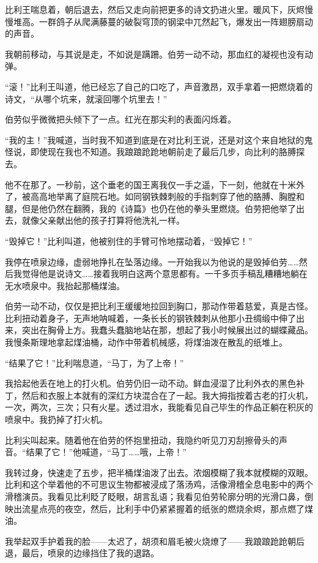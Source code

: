\documentclass[AutoFakeBold=true]{book}
\begin{document}
比利王喘息着，朝后退去，然后又走向前把更多的诗文扔进火里。暖风下，灰烬慢慢堆高。一群鸽子从爬满藤蔓的破裂穹顶的钢梁中兀然起飞，爆发出一阵翅膀扇动的声音。

我朝前移动，与其说是走，不如说是蹒跚。伯劳一动不动，那血红的凝视也没有动弹。

``滚！''比利王叫道，他已经忘了自己的口吃了，声音激昂，双手拿着一把燃烧着的诗文，``从哪个坑来，就滚回哪个坑里去！''

伯劳似乎微微把头倾下了一点。红光在那尖利的表面闪烁着。

``我的主！''我喊道，当时我不知道到底是在对比利王说，还是对这个来自地狱的鬼怪说，即使现在我也不知道。我踉踉跄跄地朝前走了最后几步，向比利的胳膊探去。

他不在那了。一秒前，这个垂老的国王离我仅一手之遥，下一刻，他就在十米外了，被高高地举离了庭院石地。如同钢铁棘刺般的手指刺穿了他的胳膊、胸膛和腿，但是他仍然在翻腾，我的《诗篇》也仍在他的拳头里燃烧。伯劳把他举了出去，就像父亲献出他的孩子打算将他洗礼一样。

``毁掉它！''比利叫道，他被别住的手臂可怜地摆动着，``毁掉它！''

我停在喷泉边缘，虚弱地挣扎在坠落边缘。一开始我以为他说的是毁掉伯劳……然后我觉得他是说诗文……接着我明白这两个意思都有。一千多页手稿乱糟糟地躺在无水喷泉中。我抬起那桶煤油。

伯劳一动不动，仅仅是把比利王缓缓地拉回到胸口，那动作带着慈爱，真是古怪。比利扭动着身子，无声地呐喊着，一条长长的钢铁棘刺从他那小丑绸缎中伸了出来，突出在胸骨上方。我蠢头蠢脑地站在那，想起了我小时候展出过的蝴蝶藏品。我慢条斯理地拿起煤油桶，动作中带着机械感，将煤油泼在散乱的纸堆上。

``结果了它！''比利喘息道，``马丁，为了上帝！''

我拾起他丢在地上的打火机。伯劳仍旧一动不动。鲜血浸湿了比利外衣的黑色补丁，然后和衣服上本就有的深红方块混合在了一起。我大拇指按着古老的打火机，一次，两次，三次；只有火星。透过泪水，我能看见自己毕生的作品正躺在积灰的喷泉中。我扔掉了打火机。

比利尖叫起来。随着他在伯劳的怀抱里扭动，我隐约听见刀刃刮擦骨头的声音。``结果了它！''他喊道，``马丁……哦，上帝！''

我转过身，快速走了五步，把半桶煤油泼了出去。浓烟模糊了我本就模糊的双眼。比利和这个举着他的不可思议生物都被浸成了落汤鸡，活像滑稽全息电影中的两个滑稽演员。我看见比利眨了眨眼，胡言乱语；我看见伯劳轮廓分明的光滑口鼻，倒映出流星点亮的夜空，然后，比利手中仍紧紧握着的纸张的燃烧余烬，那点燃了煤油。

我举起双手护着我的脸——太迟了，胡须和眉毛被火烧燎了——我踉踉跄跄朝后退，最后，喷泉的边缘挡住了我的退路。
\end{document}
